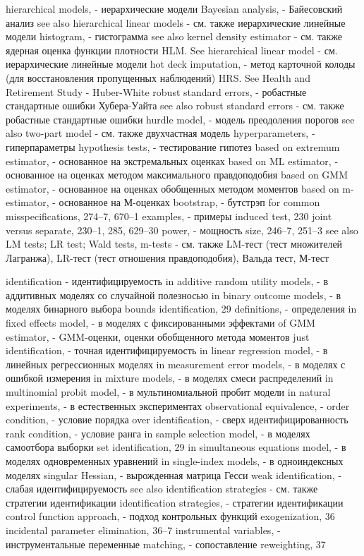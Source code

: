 hierarchical models, - иерархические модели
Bayesian analysis, - Байесовский анализ 
see also hierarchical linear models - см. также иерархические линейные модели
histogram, - гистограмма
see also kernel density estimator - см. также ядерная оценка функции плотности
HLM. See hierarchical linear model - см. иерархические линейные модели
hot deck imputation, - метод карточной колоды (для восстановления пропущенных наблюдений)
HRS. See Health and Retirement Study - 
Huber-White robust standard errors, - робастные стандартные ошибки Хубера-Уайта
see also robust standard errors - см. также робастные стандартные ошибки
hurdle model, - модель преодоления порогов
see also two-part model - см. также двухчастная модель
hyperparameters, - гиперпараметры 
hypothesis tests, - тестирование гипотез
based on extremum estimator, - основанное на экстремальных оценках
based on ML estimator, - основанное на оценках методом максимального правдоподобия
based on GMM estimator, - основанное на оценках обобщенных методом моментов
based on m-estimator, - основанное на М-оценках
bootstrap, - бутстрэп
for common misspecifications, 274–7, 670–1 
examples, - примеры 
induced test, 230
joint versus separate, 230–1, 285, 629–30 
power, - мощность
size, 246–7, 251–3
see also LM tests; LR test; Wald tests, m-tests - см. также LM-тест (тест множителей Лагранжа), LR-тест (тест отношения правдоподобия), Вальда тест, М-тест

identification - идентифицируемость
in additive random utility models, - в аддитивных моделях со случайной полезносью
in binary outcome models, - в моделях бинарного выбора
bounds identification, 29
definitions, - определения
in fixed effects model, - в моделях с фиксированными эффектами
of GMM estimator, - GMM-оценки, оценки обобщенного метода моментов
just identification, - точная идентифицируемость
in linear regression model, - в линейных регрессионных моделях
in measurement error models, - в моделях с ошибкой измерения
in mixture models, - в моделях смеси распределений
in multinomial probit model, - в мультиномиальной пробит модели
in natural experiments, - в естественных экспериментах
observational equivalence, - 
order condition, - условие порядка
over identification, - сверх идентифицированность
rank condition, - условие ранга
in sample selection model, - в моделях самоотбора выборки
set identification, 29
in simultaneous equations model, - в моделях одновременных уравнений 
in single-index models, - в одноиндексных моделях
singular Hessian, - вырожденная матрица Гесси
weak identification, - слабая идентифицируемость
see also identification strategies - см. также стратегии идентификации
identification strategies, - стратегии идентификации 
control function approach, - подход контрольных функций 
exogenization, 36
incidental parameter elimination, 36–7 
instrumental variables, - инструментальные переменные
matching, - сопоставление 
reweighting, 37

